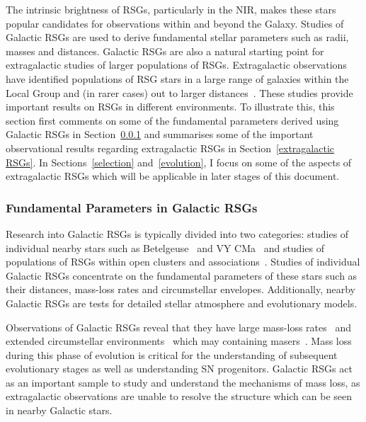 \documentclass[a4paper,12pt]{article}
\begin{document}
The intrinsic brightness of RSGs, particularly in the NIR, makes these stars popular candidates for observations within and beyond the Galaxy. 
Studies of Galactic RSGs are used to derive fundamental stellar parameters such as radii, masses and distances.
Galactic RSGs are also a natural starting point for extragalactic studies of larger populations of RSGs.  
Extragalactic observations have identified populations of RSG stars in a large range of galaxies within the Local Group and (in rarer cases) out to larger distances~\citep[e.g.][]{Elias85,Humphreys86, Massey06, Massey07, Groenewegen09,Massey13}. %
These studies provide important results on RSGs in different environments.
To illustrate this, this section first comments on some of the fundamental parameters derived using Galactic RSGs in Section~\ref{Galactic RSGs} and summarises some of the important observational results regarding extragalactic RSGs in Section~\ref{extragalactic RSGs}.
In Sections~\ref{selection} and~\ref{evolution}, I focus on some of the aspects of extragalactic RSGs which will be applicable in later stages of this document.

\subsubsection{Fundamental Parameters in Galactic RSGs}\label{Galactic RSGs}

Research into Galactic RSGs is typically divided into two categories: studies of individual nearby stars such as Betelgeuse~\citep[$197\pm 45$pc;][]{Harper08} and VY CMa~\citep[$1420\pm$ 120pc;][]{Wittowski12} and studies of populations of RSGs within open clusters and associations~\citep[e.g.][]{Levesque05,Negueruela13}.
Studies of individual Galactic RSGs concentrate on the fundamental parameters of these stars such as their distances, mass-loss rates and circumstellar envelopes. 
Additionally, nearby Galactic RSGs are tests for detailed stellar atmosphere and evolutionary models. 

Observations of Galactic RSGs reveal that they have large mass-loss rates~\citep[10$^{-(6\pm 1)}$M$_{\odot}$yr$^{-1}$;][]{Danchi94, Richards13} and extended circumstellar environments~\citep{Smith01} which may containing masers~\citep{Schuster06}.
Mass loss during this phase of evolution is critical for the understanding of subsequent evolutionary stages as well as understanding SN progenitors. 
Galactic RSGs act as an important sample to study and understand the mechanisms of mass loss, as extragalactic observations are unable to resolve the structure which can be seen in nearby Galactic stars. 
\end{document}
